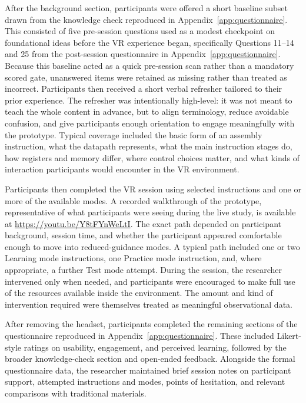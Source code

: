 After the background section, participants were offered a short baseline subset drawn from the knowledge check reproduced in Appendix~\ref{app:questionnaire}. This consisted of five pre-session questions used as a modest checkpoint on foundational ideas before the VR experience began, specifically Questions 11--14 and 25 from the post-session questionnaire in Appendix~\ref{app:questionnaire}. Because this baseline acted as a quick pre-session scan rather than a mandatory scored gate, unanswered items were retained as missing rather than treated as incorrect. Participants then received a short verbal refresher tailored to their prior experience. The refresher was intentionally high-level: it was not meant to teach the whole content in advance, but to align terminology, reduce avoidable confusion, and give participants enough orientation to engage meaningfully with the prototype. Typical coverage included the basic form of an assembly instruction, what the datapath represents, what the main instruction stages do, how registers and memory differ, where control choices matter, and what kinds of interaction participants would encounter in the VR environment.

Participants then completed the VR session using selected instructions and one or more of the available modes. A recorded walkthrough of the prototype, representative of what participants were seeing during the live study, is available at \url{https://youtu.be/Y8tFYnWeLtI}. The exact path depended on participant background, session time, and whether the participant appeared comfortable enough to move into reduced-guidance modes. A typical path included one or two Learning mode instructions, one Practice mode instruction, and, where appropriate, a further Test mode attempt. During the session, the researcher intervened only when needed, and participants were encouraged to make full use of the resources available inside the environment. The amount and kind of intervention required were themselves treated as meaningful observational data.

After removing the headset, participants completed the remaining sections of the questionnaire reproduced in Appendix~\ref{app:questionnaire}. These included Likert-style ratings on usability, engagement, and perceived learning, followed by the broader knowledge-check section and open-ended feedback. Alongside the formal questionnaire data, the researcher maintained brief session notes on participant support, attempted instructions and modes, points of hesitation, and relevant comparisons with traditional materials.

